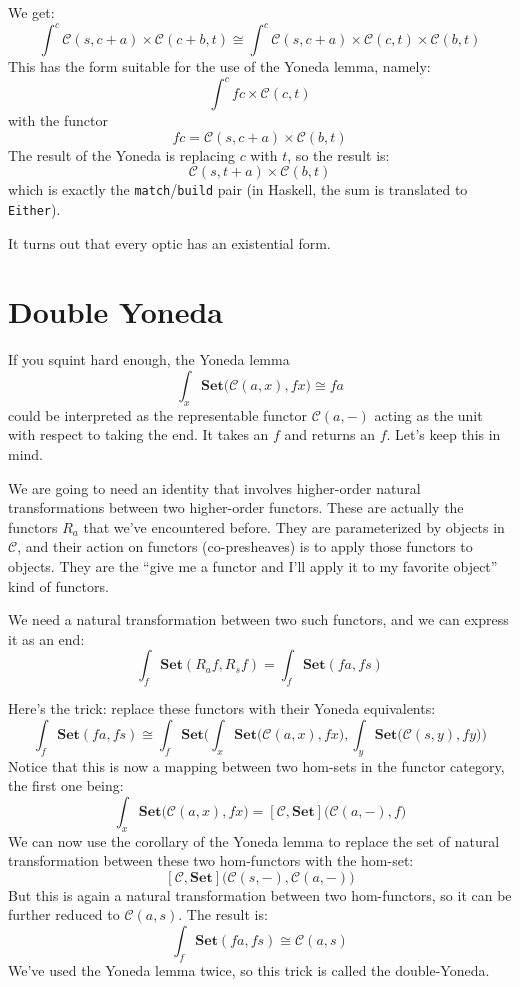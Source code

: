 \documentclass[11pt]{amsart}
\newcommand{\hask}[1]{\texttt{#1}}
\begin{document}
We get:
\[ \int^c \mathcal{C}(s, c + a) \times \mathcal{C}(c + b, t) \cong \int^c \mathcal{C}(s, c + a) \times \mathcal{C}(c, t)  \times \mathcal{C}(b, t)\]
This has the form suitable for the use of the Yoneda lemma, namely:
\[ \int^c f c \times \mathcal{C}(c, t) \]
with the functor
\[ f c = \mathcal{C}(s, c + a) \times \mathcal{C}(b, t) \]
The result of the Yoneda is replacing $c$ with $t$, so the result is:
\[ \mathcal{C}(s, t + a) \times \mathcal{C}(b, t)\]
which is exactly the \hask{match}/\hask{build} pair (in Haskell, the sum is translated to \hask{Either}).

It turns out that every optic has an existential form.

\section{Double Yoneda}

If you squint hard enough, the Yoneda lemma 
\[ \int_{x} \mathbf{Set}\big(\mathcal{C}(a, x), f x\big) \cong f a \]
could be interpreted as the representable functor $\mathcal{C}(a, -)$ acting as the unit with respect to taking the end. It takes an $f$ and returns an $f$. Let's keep this in mind.

We are going to need an identity that involves higher-order natural transformations between two higher-order functors. These are actually the functors $R_a$ that we've encountered before. They are parameterized by objects in $\mathcal{C}$, and their action on functors (co-presheaves) is to apply those functors to objects. They are the ``give me a functor and I'll apply it to my favorite object'' kind of functors. 

We need a natural transformation between two such functors, and we can express it as an end:
\[ \int_f  \mathbf{Set}( R_a f, R_s f) = \int_f  \mathbf{Set}( f a, f s) \]

Here's the trick: replace these functors with their Yoneda equivalents:
\[ \int_f  \mathbf{Set}( f a, f s) \cong \int_f  \mathbf{Set}\Big(\int_{x} \mathbf{Set}\big(\mathcal{C}(a, x), fx), \int_{y} \mathbf{Set}\big(\mathcal{C}(s, y), f y\big)\Big)\]
Notice that this is now a mapping between two hom-sets in the functor category, the first one being:
\[\int_{x} \mathbf{Set}\big(\mathcal{C}(a, x), fx\big) = [\mathcal{C}, \mathbf{Set}]\big(\mathcal{C}(a, -), f\big)\]
We can now use the corollary of the Yoneda lemma to replace the set of natural transformation between these two hom-functors with the hom-set:
\[ [\mathcal{C}, \mathbf{Set}]\big(\mathcal{C}(s, -), \mathcal{C}(a, -) \big)\]
But this is again a natural transformation between two hom-functors, so it can be further reduced to $\mathcal{C}(a, s) $. The result is:
\[\int_f  \mathbf{Set}( f a, f s) \cong \mathcal{C}(a, s) \]
We've used the Yoneda lemma twice, so this trick is called the double-Yoneda.
\end{document}
